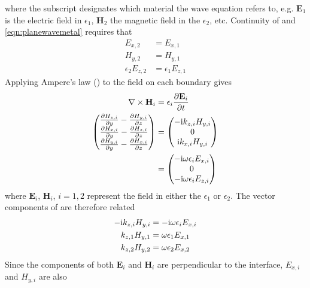 where the subscript designates which material the wave equation refers to,
e.g. $\mathbf{E}_1$ is the electric field in $\epsilon_1$, $\mathbf{H}_2$
the magnetic field in the $\epsilon_2$, etc. Continuity of
 and
\ref{eqn:planewavemetal} requires that
\begin{align}
E_{x,2}&=E_{x,1}\\
H_{y,2}&=H_{y,1}\\
\epsilon_2 E_{z,2}&=\epsilon_1 E_{z,1}
\end{align}
Applying Ampere's law () to the field on 
each boundary gives
\begin{align}
\nabla \times \mathbf{H}_i &= \epsilon_i \frac{\partial \mathbf{E}_i}{\partial t}\\
\begin{pmatrix}
\frac{\partial H_{z,i}}{\partial y} - \frac{\partial H_{y,i}}{\partial z}\\
\frac{\partial H_{x,i}}{\partial y} - \frac{\partial H_{z,i}}{\partial z}\\
\frac{\partial H_{y,i}}{\partial y} - \frac{\partial H_{x,i}}{\partial z}
\end{pmatrix}
&= \begin{pmatrix}
-{\mathrm{i}} k_{z,i} H_{y,i}\\
0\\
{\mathrm{i}} k_{x,i} H_{y,i}
\end{pmatrix}
\\
&= \begin{pmatrix}
-{\mathrm{i}} \omega \epsilon_i E_{x,i}\\
0\\
-{\mathrm{i}} \omega \epsilon_i E_{z,i}
\end{pmatrix}
\label{eqn:vectordisp}
\end{align}
where $\mathbf{E}_i$, $\mathbf{H}_i$, $i=1,2$ represent the field in either the
$\epsilon_1$ or $\epsilon_2$.  The vector components of
 are therefore related 
\begin{align}
-{\mathrm{i}} k_{z,i} H_{y,i} &= -{\mathrm{i}} \omega \epsilon_i E_{x,i}\\
k_{z,1} H_{y,1} &= \omega \epsilon_1 E_{x,1}\\
k_{z,2} H_{y,2} &= \omega \epsilon_2 E_{x,2}
\label{eqn:spderivsteptwo}
\end{align}
Since the components of both $\mathbf{E}_i$ and $\mathbf{H}_i$ are
perpendicular to the interface, $E_{x,i}$ and $H_{y,i}$ are also
